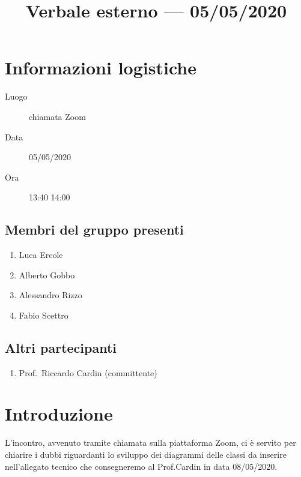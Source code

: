 \documentclass{article}
\title{Verbale esterno --- 05/05/2020}
\begin{document}


\section{Informazioni logistiche}%
\label{sec:informazioni_logistiche}

\begin{description}
  \item [Luogo] chiamata Zoom
  \item [Data] 05/05/2020
  \item [Ora] 13:40  14:00
\end{description}

\subsection{Membri del gruppo presenti}%
\label{sub:membri_del_gruppo_presenti}

\begin{enumerate}
  \item Luca Ercole
  \item Alberto Gobbo
  \item Alessandro Rizzo
  \item Fabio Scettro
\end{enumerate}

\subsection{Altri partecipanti}%
\label{sub:altri_partecipanti}

\begin{enumerate}
  \item Prof.\ Riccardo Cardin (committente)
\end{enumerate}

\section{Introduzione}%
\label{sec:introduzione}

L'incontro, avvenuto tramite chiamata sulla piattaforma Zoom, ci è servito per chiarire i dubbi riguardanti lo sviluppo dei diagrammi delle classi da inserire nell'allegato tecnico che consegneremo al Prof.Cardin in data 08/05/2020.
\end{document}
